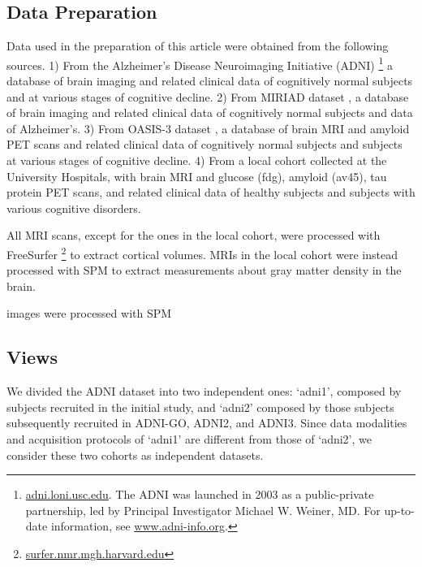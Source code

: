 \subsection{Data Preparation}
Data used in the preparation of this article were obtained from the following sources.
1) From the Alzheimer's Disease Neuroimaging Initiative (ADNI)
\footnote{
\href{http://adni.loni.usc.edu}{adni.loni.usc.edu}. The ADNI was launched in 2003 as a public-private partnership, led by Principal Investigator Michael W. Weiner, MD. For up-to-date information, see \href{www.adni-info.org}{www.adni-info.org}.}
a database of brain imaging and related clinical data of cognitively normal subjects and at various stages of cognitive decline.
2) From MIRIAD dataset \cite{Miriad}, a database of brain imaging and related clinical data of cognitively normal subjects and data of Alzheimer's.
3) From OASIS-3 dataset \citep{oasis3}, a database of brain MRI and amyloid PET scans and related clinical data of cognitively normal subjects and subjects at various stages of cognitive decline.
4) From a local cohort collected at the University Hospitals, with brain MRI and glucose (fdg), amyloid (av45), tau protein PET scans, and related clinical data of healthy subjects and subjects with various cognitive disorders.

All MRI scans, except for the ones in the local cohort, were processed with FreeSurfer \footnote{\href{https://surfer.nmr.mgh.harvard.edu/}{surfer.nmr.mgh.harvard.edu}} \citep{freesurfer} to extract cortical volumes.
MRIs in the local cohort were instead processed with SPM \cite{Ashburner2000} to extract measurements about gray matter density in the brain.


 images were processed with SPM
\subsection{Views}

We divided the ADNI dataset into two independent ones:
`adni1', composed by subjects recruited in the initial study,
and `adni2' composed by those subjects subsequently recruited in ADNI-GO, ADNI2, and ADNI3.
Since data modalities and acquisition protocols of `adni1' are different from those of `adni2', we consider these two cohorts as independent datasets.

